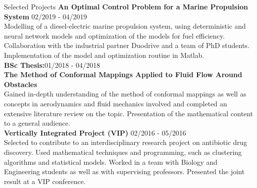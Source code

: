 \documentclass{resume} %
\begin{document}
\begin{rSection}{Selected Projects}
	{\bf An Optimal Control Problem for a Marine Propulsion System} \hfill{02/2019 - 04/2019}\\
 	Modelling of a diesel-electric marine propulsion system, using deterministic and neural network models and optimization of the models for fuel efficiency. Collaboration with the industrial partner Duodrive and a team of PhD students. Implementation of the model and optimization routine in Matlab.\\

	{\bf BSc Thesis:}\hfill{01/2018 - 04/2018}\\
	{\bf The Method of Conformal Mappings Applied to Fluid Flow Around Obstacles} \\
	Gained in-depth understanding of the method of conformal mappings as well as concepts in aerodynamics and fluid mechanics involved and completed an extensive literature review on the topic. Presentation of the mathematical content to a general audience.\\
	
	{\bf Vertically Integrated Project (VIP)} \hfill{02/2016 - 05/2016}\\
	Selected to contribute to an interdisciplinary research project on antibiotic drug discovery. Used mathematical techniques and programming, such as clustering algorithms and statistical models. Worked in a team with Biology and Engineering students as well as with supervising professors.	Presented the joint result at a VIP conference. 
\end{rSection}
\end{document}
